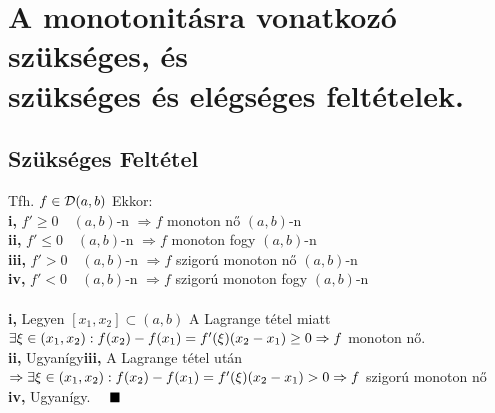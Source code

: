 \documentclass[a4paper,12pt]{article}
\begin{document}
\section{A monotonitásra vonatkozó szükséges, és \\ szükséges és elégséges feltételek.}
\subsection{Szükséges Feltétel}
\tetel Tfh. $f\in \displaystyle\mathcal{D}(a,b)$ Ekkor: \\[0.1cm]\hspace*{0.3cm}\textbf{i,} $f'\geq0\quad(a,b)$-n $\Rightarrow f$ monoton nő $(a,b)$-n\\[0.1cm]\hspace*{0.3cm}\textbf{ii,} $f'\leq0\quad(a,b)$-n $\Rightarrow f$ monoton fogy $(a,b)$-n\\[0.1cm]\hspace*{0.3cm}\textbf{iii,} $f'>0\quad (a,b)$-n $\Rightarrow f$ szigorú monoton nő $(a,b)$-n\\[0.1cm]\hspace*{0.3cm}\textbf{iv,} $f'<0\quad (a,b)$-n $\Rightarrow f$ szigorú monoton fogy $(a,b)$-n\\[0.2cm]\biz \\[0.1cm]\textbf{i,} Legyen $[x_1,x_2]\subset(a,b)$ A Lagrange tétel miatt $\exists\xi\in (x_1,x_2):\\[0.2cm]f(x_2)-f(x_1)=f'(\xi)(x_2-x_1)\geq0\Rightarrow f$ monoton nő.\\[0.1cm]\textbf{ii,} Ugyanígy\newpage\textbf{iii,} A Lagrange tétel után $\Rightarrow\exists\xi\in (x_1,x_2):\\[0.2cm]f(x_2)-f(x_1)=f'(\xi)(x_2-x_1)>0 \Rightarrow f$ szigorú monoton nő\\[0.1cm]\textbf{iv,} Ugyanígy. $\quad\blacksquare$
\end{document}
